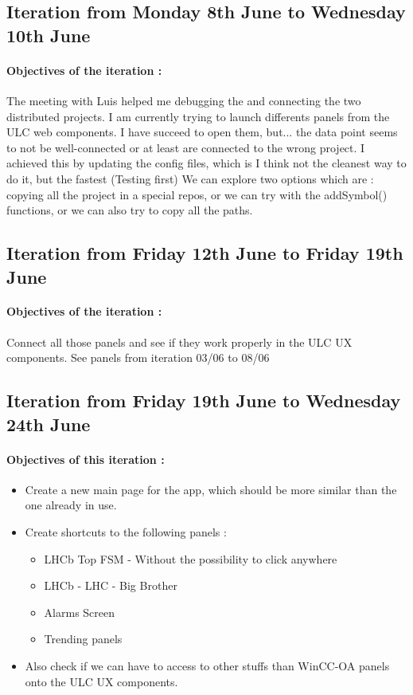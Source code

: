 \documentclass[a4paper, 12pt]{article}
\begin{document}
\begin{appendix}
    \subsection{Iteration from Monday 8th June to Wednesday 10th June}
    \paragraph{Objectives of the iteration :}
    The meeting with Luis helped me debugging the and connecting the two distributed projects. I am currently trying to launch differents panels from the ULC web components.
    I have succeed to open them, but... the data point seems to not be well-connected or at least are connected to the wrong project.
    I achieved this by updating the config files, which is I think not the cleanest way to do it, but the fastest (Testing first)
    We can explore two options which are : copying all the project in a special repos, or we can try with the addSymbol() functions, or we can also try to copy all the paths.

    \subsection{Iteration from Friday 12th June to Friday 19th June}
    \paragraph{Objectives of the iteration :}
    Connect all those panels and see if they work properly in the ULC UX components. See panels from iteration 03/06 to 08/06
    \subsection{Iteration from Friday 19th June to Wednesday 24th June}
    \paragraph{Objectives of this iteration :}
    \begin{itemize}
        \item Create a new main page for the app, which should be more similar than the one already in use.
        \item Create shortcuts to the following panels :
        \begin{itemize}
            \item LHCb Top FSM - Without the possibility to click anywhere
            \item LHCb - LHC - Big Brother
            \item Alarms Screen
            \item Trending panels
        \end{itemize}
        \item Also check if we can have to access to other stuffs than WinCC-OA panels onto the ULC UX components.
    \end{itemize}

\end{appendix}
\end{document}
